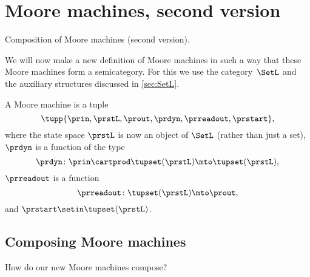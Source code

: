 
\section{Moore machines, second version}
\label{sec:moore-semicategorically}

\begin{marginfigure}
    \centering
    \caption{Composition of Moore machines (second version).}
    \label{fig:comp_moore_2}
\end{marginfigure}

We will now make a new definition of Moore machines in such a way that these Moore machines form a semicategory.
For this we use the category~$\SetL$ and the auxiliary structures discussed in \cref{sec:SetL}.

\begin{definition}
    \label{def:moore_machine}
    A Moore machine is a tuple
    \begin{equation}
        \label{eq:moore-tuple-improved}
        \tupp{\prin,\prstL,\prout,\prdyn,\prreadout,\prstart},
    \end{equation}
    where the state space $\prstL$ is now an object of $\SetL$ (rather than just a set), $\prdyn$ is a function of the type
    \begin{equation}
        \prdyn \colon \prin \cartprod \tupset(\prstL) \mto \tupset(\prstL),
    \end{equation}
    $\prreadout$ is a function
    \begin{equation}
        \prreadout \colon \tupset(\prstL) \mto \prout,
    \end{equation}
    and $\prstart \setin \tupset(\prstL)$.
\end{definition}

\subsection{Composing Moore machines}
\label{sec:composing-moore-machines}

How do our new Moore machines compose?

